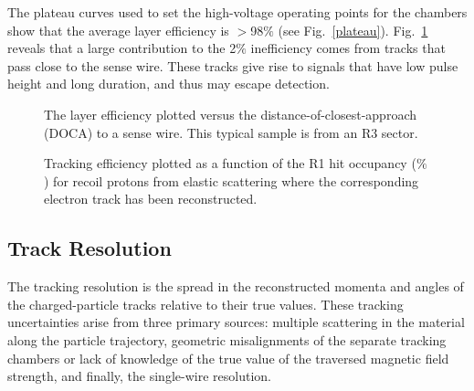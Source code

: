 The plateau curves used to set the high-voltage operating points for the chambers 
show that the average layer efficiency is $>$98$\%$ (see Fig.~\ref{plateau}).  
Fig.~\ref{edoca} reveals that a large contribution to the 2$\%$ inefficiency comes 
from tracks that pass close to the sense wire.  These tracks give rise to signals 
that have low pulse height and long duration, and thus may escape detection.


\vfil
\eject

\begin{figure}[htpb]
\vspace{5.0cm} 
\caption{\small{The layer efficiency plotted versus the distance-of-closest-approach
(DOCA) to a sense wire.  This typical sample is from an R3 sector.}}
\label{edoca}
\end{figure}

\begin{figure}[htpb]
\vspace{6.3cm} 
\caption{\small{Tracking efficiency plotted as a function of the R1 hit
occupancy ($\%$) for recoil protons from elastic scattering where the
corresponding electron track has been reconstructed.}}
\label{trkeff}
\end{figure}

\subsection{Track Resolution}

\hskip 0.15in
The tracking resolution is the spread in the reconstructed
momenta and angles of the charged-particle tracks relative to their true values.
These tracking uncertainties arise from three primary sources: multiple scattering 
in the material along the particle trajectory, geometric misalignments of the separate 
tracking chambers or lack of knowledge 
of the true value of the traversed magnetic field strength, and finally, the  
single-wire resolution.  

